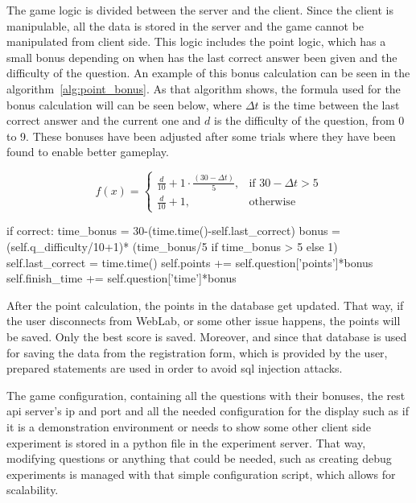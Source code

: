 The game logic is divided between the server and the client. Since the client is manipulable, all
the data is stored in the server and the game cannot be manipulated from client side. This logic
includes the point logic, which has a small bonus depending on when has the last correct answer been
given and the difficulty of the question. An example of this bonus calculation can be seen in the
algorithm~\ref{alg:point_bonus}. As that algorithm shows, the formula used for the bonus calculation
will can be seen below, where $\Delta{t}$ is the time between the last correct answer and the
current one and $d$ is the difficulty of the question, from 0 to 9. These bonuses have been adjusted
after some trials where they have been found to enable better gameplay.

\[
    f(x)=
\begin{cases}
    \frac{d}{10}+1\cdot\frac{(30-\Delta{t})}{5},	& \text{if } 30-\Delta{t} > 5\\
    \frac{d}{10}+1,									& \text{otherwise}
\end{cases}
\]

\begin{center}
\begin{minipage}{.9\textwidth}
\singlespace
{}
\begin{pyglist}[language=python, caption={Point bonus calculation.},
	label={alg:point_bonus}, listingname={Algorithm}, numbers=left]
if correct:
    time_bonus = 30-(time.time()-self.last_correct)
    bonus = (self.q_difficulty/10+1)*
        (time_bonus/5 if time_bonus > 5 else 1)
    self.last_correct = time.time()
    self.points += self.question['points']*bonus
    self.finish_time += self.question['time']*bonus
\end{pyglist}
\end{minipage}
\end{center}

After the point calculation, the points in the database get updated. That way, if the user
disconnects from WebLab, or some other issue happens, the points will be saved. Only the best
score is saved. Moreover, and since that database is used for saving the data from the registration
form, which is provided by the user, prepared statements are used in order to avoid \acrshort{sql}
injection attacks.

The game configuration, containing all the questions with their bonuses, the \acrshort{rest}
\acrshort{api} server's \acrshort{ip} and port and all the needed configuration for the display such
as if it is a demonstration environment or needs to show some other client side experiment is stored
in a python file in the experiment server. That way, modifying questions or anything that could be
needed, such as creating debug experiments is managed with that simple configuration script, which
allows for scalability.

